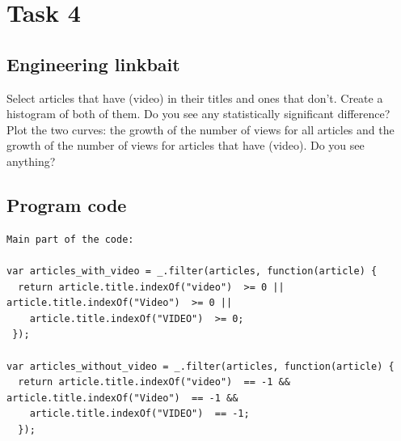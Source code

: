 \documentclass[12pt,a4paper]{article}
\begin{document}
\section*{Task 4}

\subsection*{Engineering linkbait}
Select articles that have (video) in their titles and ones that don’t. Create a
histogram of both of them. Do you see any statistically significant difference?\\
Plot the two curves: the growth of the number of views for all articles and
the growth of the number of views for articles that have (video). Do you see
anything?
\subsection*{Program code}
\begin{lstlisting}
Main part of the code:

var articles_with_video = _.filter(articles, function(article) {
  return article.title.indexOf("video")  >= 0 || article.title.indexOf("Video")  >= 0 ||
    article.title.indexOf("VIDEO")  >= 0;
 });

var articles_without_video = _.filter(articles, function(article) {
  return article.title.indexOf("video")  == -1 && article.title.indexOf("Video")  == -1 &&
    article.title.indexOf("VIDEO")  == -1;
  });

\end{lstlisting}
\end{document}
